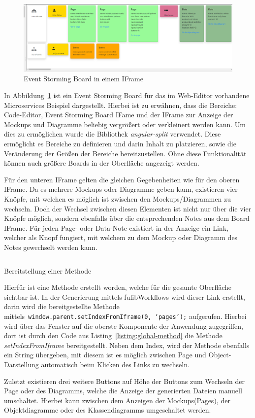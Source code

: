 \begin{figure}[h]
    \centering
    \includegraphics[width=1.0\textwidth]{images/3.2/board}
    \caption{Event Storming Board in einem IFrame}
    \label{fig:esBoard}
\end{figure}

In Abbildung~\ref{fig:esBoard} ist ein Event Storming Board für das im Web-Editor vorhandene Microservices Beispiel dargestellt.
Hierbei ist zu erwähnen, dass die Bereiche: Code-Editor, Event Storming Board IFame und der IFrame zur Anzeige der Mockups und Diagramme beliebig vergrößert oder verkleinert werden kann.
Um dies zu ermöglichen wurde die Bibliothek \textit{angular-split} verwendet.
Diese ermöglicht es Bereiche zu definieren und darin Inhalt zu platzieren, sowie die Veränderung der Größen der Bereiche bereitzustellen.\cite*{angular-split}
Ohne diese Funktionalität können auch größere Boards in der Oberfläche angezeigt werden.

Für den unteren IFrame gelten die gleichen Gegebenheiten wie für den oberen IFrame.
Da es mehrere Mockups oder Diagramme geben kann, existieren vier Knöpfe, mit welchen es möglich ist zwischen den Mockups/Diagrammen zu wechseln.
Doch der Wechsel zwischen diesen Elementen ist nicht nur über die vier Knöpfe möglich, sondern ebenfalls über die entsprechenden Notes aus dem Board IFrame.
Für jeden Page- oder Data-Note existiert in der Anzeige ein Link, welcher als Knopf fungiert, mit welchem zu dem Mockup oder Diagramm des Notes gewechselt werden kann.

\begin{listing}[!ht]
    \inputminted{ts}{listings/3.2/method.ts}
    \caption{Bereitstellung einer Methode}
    \label{listing:global-method}
\end{listing}

Hierfür ist eine Methode erstellt worden, welche für die gesamte Oberfläche sichtbar ist.
In der Generierung mittels fulibWorkflows wird dieser Link erstellt, darin wird die bereitgestellte Methode mittels~\texttt{window.parent.setIndexFromIframe(0, `pages');} aufgerufen.
Hierbei wird über das Fenster auf die oberste Komponente der Anwendung zugegriffen, dort ist durch den Code aus Listing~\ref{listing:global-method}
die Methode \textit{setIndexFromIframe} bereitgestellt.
Neben dem Index, wird der Methode ebenfalls ein String übergeben, mit diesem ist es möglich zwischen Page und Object-Darstellung automatisch beim Klicken des Links zu wechseln.

Zuletzt existieren drei weitere Buttons auf Höhe der Buttons zum Wechseln der Page oder des Diagramms, welche die Anzeige der generierten Dateien manuell umschaltet.
Hierbei kann zwischen dem Anzeigen der Mockups(Pages), der Objektdiagramme oder des Klassendiagramms umgeschaltet werden.
